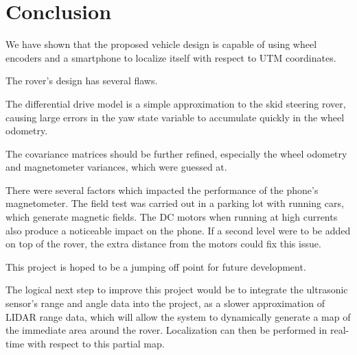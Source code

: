 \chapter*{Conclusion}

We have shown that the proposed vehicle design is capable of using wheel encoders and a smartphone to localize itself with respect to UTM coordinates.

The rover's design has several flaws.

The differential drive model is a simple approximation to the skid steering rover, causing large errors in the yaw state variable to accumulate quickly in the wheel odometry.

The covariance matrices should be further refined, especially the wheel odometry and magnetometer variances, which were guessed at.


There were several factors which impacted the performance of the phone's magnetometer. The field test was carried out in a parking lot with running cars, which generate magnetic fields. The DC motors when running at high currents also produce a noticeable impact on the phone. If a second level were to be added on top of the rover, the extra distance from the motors could fix this issue.


This project is hoped to be a jumping off point for future development.

The logical next step to improve this project would be to integrate the ultrasonic sensor's range and angle data into the project, as a slower approximation of LIDAR range data, which will allow the system to dynamically generate a map of the immediate area around the rover. Localization can then be performed in real-time with respect to this partial map.



